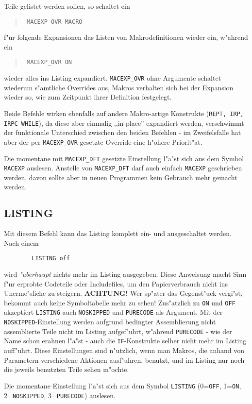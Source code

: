 \documentclass[12pt,a4paper,twoside]{report}
\makeatletter
\newcommand{\ii}[1]{{\it #1}}
\newcommand{\bb}[1]{{\bf #1}}
\newcommand{\tty}[1]{{\tt #1}}
\newcommand{\ttindex}[1]{\index{#1@{\tt #1}}}
\makeatother
\begin{document}
Teile gelistet werden sollen, so schaltet ein
\begin{quote}{\tt
	MACEXP\_OVR  MACRO
}\end{quote}
f"ur folgende Expansionen das Listen von Makrodefinitionen wieder ein,
w"ahrend ein
\begin{quote}{\tt
	MACEXP\_OVR ON
}\end{quote}
wieder alles ins Listing expandiert.  \tty{MACEXP\_OVR} ohne
Argumente schaltet wiederum s"amtliche Overrides aus, Makros
verhalten sich bei der Expansion wieder so, wie zum Zeitpunkt ihrer
Definition festgelegt.
\par
Beide Befehle wirken ebenfalls auf andere Makro-artige Konstrukte
(\tty{REPT, IRP, IRPC WHILE}), da diese aber einmalig ,,in-place''
expandiert werden, verschwimmt der funktionale Unterschied zwischen
den beiden Befehlen - im Zweifelsfalle hat aber der per
\tty{MACEXP\_OVR} gesetzte Override eine h"ohere Priorit"at.

Die momentane mit \tty{MACEXP\_DFT} gesetzte Einstellung l"a"st sich
aus dem Symbol \tty{MACEXP} auslesen.  Anstelle von \tty{MACEXP\_DFT}
darf auch einfach \tty{MACEXP} geschrieben werden, davon sollte aber
in neuen Programmen kein Gebrauch mehr gemacht werden.


\subsection{LISTING}
\ttindex{LISTING}

Mit diesem Befehl kann das Listing komplett ein- und ausgeschaltet
werden. Nach einem
\begin{verbatim}
        LISTING off
\end{verbatim}
wird \ii{"uberhaupt} nichts mehr im Listing ausgegeben.  Diese Anweisung
macht Sinn f"ur erprobte Codeteile oder Includefiles, um den
Papierverbrauch nicht ins Unerme"sliche zu steigern.  \bb{ACHTUNG!}
Wer sp"ater das Gegenst"uck vergi"st, bekommt auch keine Symboltabelle
mehr zu sehen!  Zus"atzlich zu \tty{ON} und \tty{OFF} akzeptiert
\tty{LISTING} auch \tty{NOSKIPPED} und \tty{PURECODE} als Argument.  Mit
der \tty{NOSKIPPED}-Einstellung werden aufgrund bedingter Assemblierung
nicht assemblierte Teile nicht im Listing aufgef"uhrt, w"ahrend
\tty{PURECODE} - wie der Name schon erahnen l"a"st - auch die
\tty{IF}-Konstrukte selber nicht mehr im Listing auff"uhrt.  Diese
Einstellungen sind n"utzlich, wenn man Makros, die anhand von
Parametern verschiedene Aktionen ausf"uhren, benutzt, und im Listing
nur noch die jeweils benutzten Teile sehen m"ochte.
\par
Die momentane Einstellung l"a"st sich aus dem Symbol \tty{LISTING}
(0=\tty{OFF}, 1=\tty{ON}, 2=\tty{NOSKIPPED}, 3=\tty{PURECODE}) auslesen.
\end{document}
